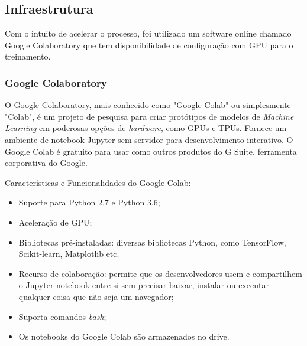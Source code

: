 
\subsection{Infraestrutura}

Com o intuito de acelerar o processo, foi utilizado um software online chamado Google Colaboratory que tem disponibilidade de configuração com GPU para o treinamento. 


\subsubsection{Google Colaboratory}
O Google Colaboratory, mais conhecido como "Google Colab" ou simplesmente "Colab", é um projeto de pesquisa para criar protótipos de modelos de \textit{Machine Learning} em poderosas opções de \textit{hardware}, como GPUs e TPUs. Fornece um ambiente de notebook Jupyter sem servidor para desenvolvimento interativo. O Google Colab é gratuito para usar como outros produtos do G Suite, ferramenta corporativa do Google. \cite{colabdetail}
 
Características e Funcionalidades do Google Colab:

\begin{itemize}
    \item Suporte para Python 2.7 e Python 3.6;
    \item Aceleração de GPU;
    \item Bibliotecas pré-instaladas: diversas bibliotecas Python, como TensorFlow, Scikit-learn, Matplotlib etc.
    \item Recurso de colaboração: permite que os desenvolvedores usem e compartilhem o Jupyter notebook entre si sem precisar baixar, instalar ou executar qualquer coisa que não seja um navegador;
    \item Suporta comandos \textit{bash};
    \item Os notebooks do Google Colab são armazenados no drive.
\end{itemize}

